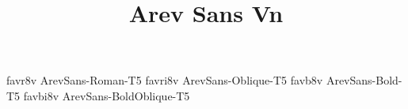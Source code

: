 \documentclass[test]{vnsample}
\title{Arev Sans Vn}
\begin{document}
\begin{shortsample}
  {favr8v}  {ArevSans-Roman-T5}
 {favri8v} {ArevSans-Oblique-T5}
  {favb8v}  {ArevSans-Bold-T5}
 {favbi8v} {ArevSans-BoldOblique-T5}
\end{shortsample}
\end{document}
